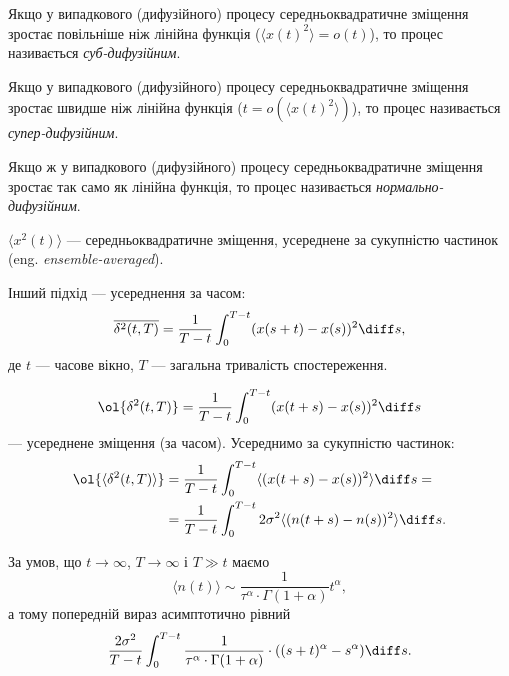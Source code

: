 \begin{definition}
    Якщо у випадкового (дифузійного) процесу середньоквадратичне зміщення зростає повільніше ніж лінійна функція ($\langle x(t)^2 \rangle = o(t)$), то процес називається \textit{суб-дифузійним}.
\end{definition}

\begin{definition}
    Якщо у випадкового (дифузійного) процесу середньоквадратичне зміщення зростає швидше ніж лінійна функція ($t = o(\langle x(t)^2 \rangle)$), то процес називається \textit{супер-дифузійним}.
\end{definition}

\begin{definition}
    Якщо ж у випадкового (дифузійного) процесу середньоквадратичне зміщення зростає так само як лінійна функція, то процес називається \textit{нормально-дифузійним}.
\end{definition}

\begin{remark}
    $\langle x^2(t) \rangle$ --- середньоквадратичне зміщення, усереднене за сукупністю частинок (eng. \textit{ensemble-averaged}).
\end{remark}

Інший підхід --- усереднення за часом:
\begin{equation}
    \overline{\delta^2(t, T)} = \frac{1}{T - t} \int_0^{T - t} (x(s + t) - x(s))^2 \diff s,
\end{equation}
де $t$ --- часове вікно, $T$ --- загальна тривалість спостереження.

\begin{equation}
    \ol{\delta^2(t, T)}
    = \frac{1}{T - t} \int_0^{T - t} ( x(t + s) - x(s) )^2 \diff s
\end{equation}
--- усереднене зміщення (за часом). Усереднимо за сукупністю частинок:
\begin{equation}
    \begin{aligned}
        \ol{\langle \delta^2(t, T) \rangle}
        &= \frac{1}{T - t} \int_0^{T - t} \langle ( x(t + s) - x(s) )^2 \rangle \diff s = \\
        &= \frac{1}{T - t} \int_0^{T - t} 2 \sigma^2 \langle ( n(t + s) - n(s) )^2 \rangle \diff s.
    \end{aligned}
\end{equation}

За умов, що $t \to \infty$, $T \to \infty$ і $T \gg t$ маємо
\begin{equation}
    \langle n(t) \rangle
    \sim \frac{1}{\tau^\alpha \cdot \Gamma(1 + \alpha)} t^\alpha,
\end{equation}
а тому попередній вираз асимптотично рівний
\begin{equation}
    \frac{2 \sigma^2}{T - t} \int_0^{T - t} \frac{1}{\tau^\alpha \cdot \Gamma(1 + \alpha)} \cdot ( (s + t)^\alpha - s^\alpha ) \diff s.
\end{equation}

